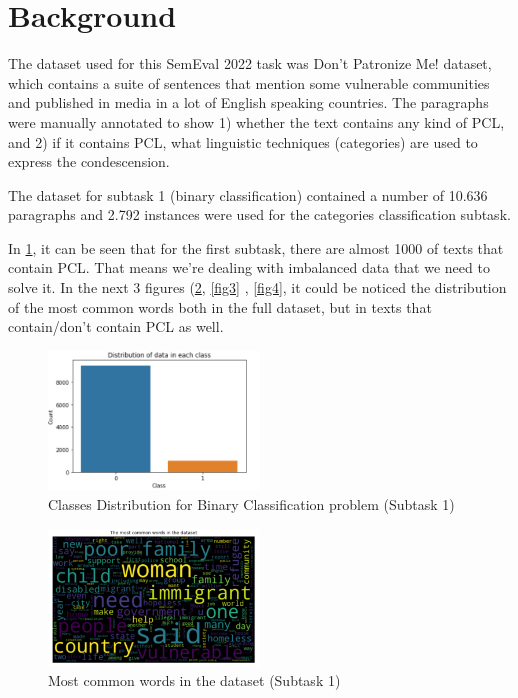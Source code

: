 \documentclass[11pt]{article}
\begin{document}
\section{Background}

The dataset used for this SemEval 2022 task was Don't Patronize Me! dataset,
which contains a suite of sentences that mention some vulnerable communities
and published in media in a lot of English speaking countries. The
paragraphs were manually annotated to show 1) whether the text contains any
kind of PCL, and 2) if it contains PCL, what linguistic techniques
(categories) are used to express the condescension.

The dataset for subtask 1 (binary classification) contained a number of
10.636 paragraphs and 2.792 instances were used for the categories
classification subtask.

In \ref{fig1}, it can be seen that for the first subtask, there are almost
1000 of texts that contain PCL. That means we're dealing with imbalanced
data that we need to solve it. In the next 3 figures (\ref{fig2}, \ref{fig3}%
, \ref{fig4}, it could be noticed the distribution of the most common words
both in the full dataset, but in texts that contain/don't contain PCL as
well.

\begin{figure}[h]
\centering
\includegraphics[width=0.5\textwidth]{DataDistribution.png}
\caption{Classes Distribution for Binary Classification problem (Subtask 1)}
\label{fig1}
\end{figure}

\begin{figure}[h]
\centering
\includegraphics[width=0.5\textwidth]{common.png}
\caption{Most common words in the dataset (Subtask 1)}
\label{fig2}
\end{figure}
\end{document}
